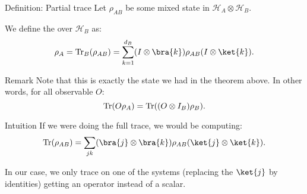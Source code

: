 \documentclass[a4paper]{article}
\begin{document}
\begin{parag}{Definition: Partial trace}
    Let $\rho_{AB}$ be some mixed state in $\mathcal{H}_A \otimes \mathcal{H}_B$.

    We define the  over $\mathcal{H}_B$ as:
    \[\rho_A = \Tr_{B}\left(\rho_{AB}\right) = \sum_{k=1}^{d_B} \left(I \otimes \bra{k}\right) \rho_{AB} \left(I \otimes \ket{k}\right).\]

    \begin{subparag}{Remark}
        Note that this is exactly the state we had in the theorem above. In other words, for all observable $O$: 
        \[\Tr\left(O \rho_A\right) = \Tr\left(\left(O \otimes I_B\right) \rho_B\right).\]
    \end{subparag}

    \begin{subparag}{Intuition}
        If we were doing the full trace, we would be computing: 
        \[\Tr\left(\rho_{AB}\right) = \sum_{jk} \left(\bra{j} \otimes \bra{k}\right) \rho_{AB} \left(\ket{j} \otimes \ket{k}\right).\]

        In our case, we only trace on one of the systems (replacing the $\ket{j}$ by identities) getting an operator instead of a scalar.
    \end{subparag}
\end{parag}
\end{document}
